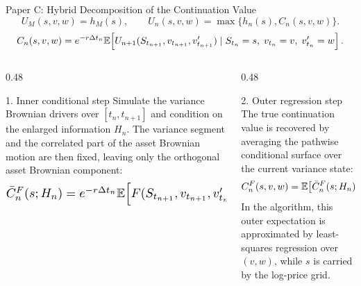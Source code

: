 \begin{frame}{Paper C: Hybrid Decomposition of the Continuation Value}
  \vspace{-0.35em}
  {\scriptsize
  \[
  U_M(s,v,w)=h_M(s),\qquad
  U_n(s,v,w)=\max\{h_n(s),C_n(s,v,w)\}.
  \]
  \[
  C_n(s,v,w)=e^{-r\Delta t_n}
  \mathbb{E}\!\left[
  U_{n+1}(S_{t_{n+1}},v_{t_{n+1}},v'_{t_{n+1}})
  \mid S_{t_n}=s,\;v_{t_n}=v,\;v'_{t_n}=w
  \right].
  \]
  }
  \vspace{-0.25em}
  \begin{columns}[T,onlytextwidth]
    \begin{column}{0.48\textwidth}
      \begin{block}{1. Inner conditional step}
        {\scriptsize
        Simulate the variance Brownian drivers over \([t_n,t_{n+1}]\) and condition on the enlarged information \(H_n\). The variance segment and the correlated part of the asset Brownian motion are then fixed, leaving only the orthogonal asset Brownian component:
        \[
        \resizebox{0.98\linewidth}{!}{$
        \bar C_n^F(s;H_n)=e^{-r\Delta t_n}
        \E\!\left[
        F(S_{t_{n+1}},v_{t_{n+1}},v'_{t_{n+1}})
        \mid S_{t_n}=s,\;H_n
        \right].
        $}
        \]
        }
      \end{block}
    \end{column}
    \begin{column}{0.48\textwidth}
      \begin{block}{2. Outer regression step}
        {\scriptsize
        The true continuation value is recovered by averaging the pathwise conditional surface over the current variance state:
        \[
        C_n^F(s,v,w)=
        \mathbb{E}\!\left[\bar C_n^F(s;H_n)
        \mid v_{t_n}=v,\;v'_{t_n}=w\right].
        \]
        In the algorithm, this outer expectation is approximated by least-squares regression over \((v,w)\), while \(s\) is carried by the log-price grid.}
      \end{block}
    \end{column}
  \end{columns}
  \vspace{0.15em}
\end{frame}

